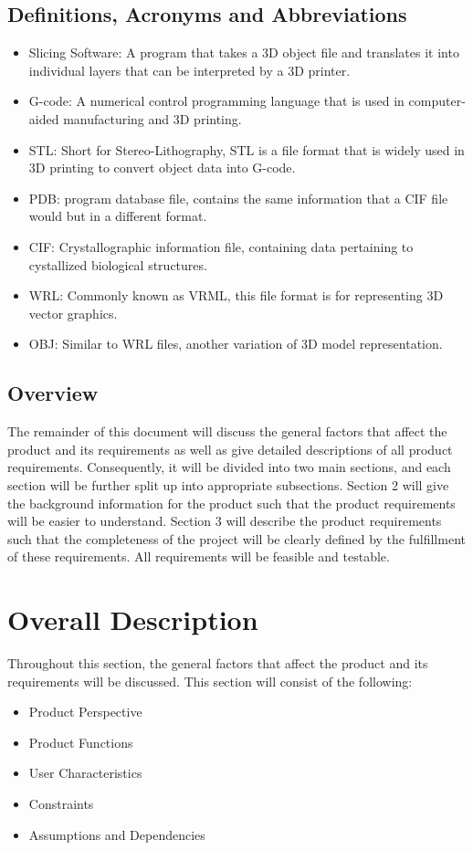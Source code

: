 \documentclass[letterpaper, onecolumn, draftclsnofoot, 10pt, compsoc]{IEEEtran}
\begin{document}
\subsection{Definitions, Acronyms and Abbreviations} %
  \begin{itemize}
  	\item Slicing Software: A program that takes a 3D object file and translates it into individual layers that can be interpreted by a 3D printer.
    \item G-code: A numerical control programming language that is used in computer-aided manufacturing and 3D printing.
    \item STL: Short for Stereo-Lithography, STL is a file format that is widely used in 3D printing to convert object data into G-code.
    \item PDB: program database file, contains the same information that a CIF file would but in a different format.
    \item CIF: Crystallographic information file, containing data pertaining to cystallized biological structures. 
    \item WRL: Commonly known as VRML, this file format is for representing 3D vector graphics.
    \item OBJ: Similar to WRL files, another variation of 3D model representation.
  \end{itemize}

\subsection{Overview} %
The remainder of this document will discuss the general factors that affect the product and its requirements as well as give detailed descriptions of all product requirements. 
Consequently, it will be divided into two main sections, and each section will be further split up into appropriate subsections.
Section 2 will give the background information for the product such that the product requirements will be easier to understand.
Section 3 will describe the product requirements such that the completeness of the project will be clearly defined by the fulfillment of these requirements.
All requirements will be feasible and testable.

\section{Overall Description}
Throughout this section, the general factors that affect the product and its requirements will be discussed. 
This section will consist of the following:
\begin{itemize}
	\item Product Perspective
    \item Product Functions
    \item User Characteristics
    \item Constraints
    \item Assumptions and Dependencies
\end{itemize}
\end{document}
